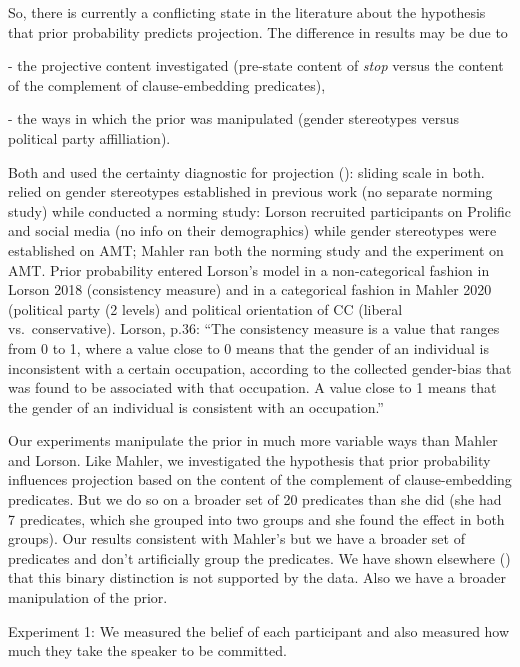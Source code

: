\documentclass[11pt,fleqn]{article}
\newcommand{\6}{\mbox{$[\hspace*{-.6mm}[$}}
\newcommand{\9}{\mbox{$]\hspace*{-.6mm}]$}}
\begin{document}
So, there is currently a conflicting state in the literature about the hypothesis that prior probability predicts projection. The difference in results may be due to 

- the projective content investigated (pre-state content of {\em stop} versus the content of the complement of clause-embedding predicates), 

- the ways in which the prior was manipulated (gender stereotypes versus political party affilliation). 

Both \citealt{lorson2018} and \citealt{mahler2020} used the certainty diagnostic for projection (\citealt{tbd-variability}): sliding scale in both. \citealt{lorson2018} relied on gender stereotypes established in previous work (no separate norming study) while \citealt{mahler2020} conducted a norming study: Lorson recruited participants on Prolific and social media (no info on their demographics) while gender stereotypes were established on AMT; Mahler ran both the norming study and the experiment on AMT. Prior probability entered Lorson's model in a non-categorical fashion in Lorson 2018 (consistency measure) and in a categorical fashion in Mahler 2020 (political party (2 levels) and political orientation of CC (liberal vs.\ conservative). Lorson, p.36: ``The consistency measure is a value that ranges from 0 to 1, where a value close to 0 means that the gender of an individual is inconsistent with a certain occupation, according to the collected gender-bias that was found to be associated with that occupation. A value close to 1 means that the gender of an individual is consistent with an occupation.''

Our experiments manipulate the prior in much more variable ways than Mahler and Lorson. Like Mahler, we investigated the hypothesis that prior probability influences projection based on the content of the complement of clause-embedding predicates. But we do so on a broader set of 20 predicates than she did (she had 7 predicates, which she grouped into two groups and she found the effect in both groups). Our results consistent with Mahler's but we have a broader set of predicates and don't artificially group the predicates. We have shown elsewhere (\citealt{tonhauser-degen-factive}) that this binary distinction is not supported by the data. Also we have a broader manipulation of the prior.



Experiment 1: We measured the belief of each participant and also measured how much they take the speaker to be committed.
\end{document}
